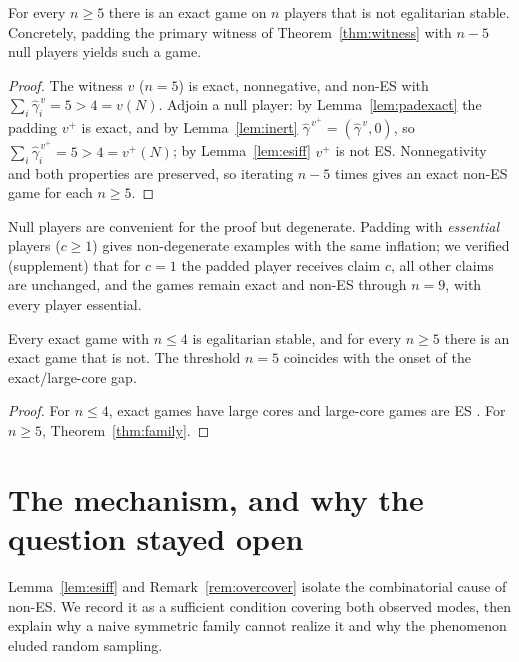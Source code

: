 \begin{theorem}\label{thm:family}
For every $n\ge5$ there is an exact game on $n$ players that is not egalitarian
stable. Concretely, padding the primary witness of Theorem~\ref{thm:witness}
with $n-5$ null players yields such a game.
\end{theorem}

\begin{proof}
The witness $v$ ($n=5$) is exact, nonnegative, and non-ES with
$\sum_i\widehat\gamma^{\,v}_i=5>4=v(N)$. Adjoin a null player: by
Lemma~\ref{lem:padexact} the padding $v^{+}$ is exact, and by
Lemma~\ref{lem:inert} $\widehat\gamma^{\,v^{+}}=(\widehat\gamma^{\,v},0)$, so
$\sum_i\widehat\gamma^{\,v^{+}}_i=5>4=v^{+}(N)$; by Lemma~\ref{lem:esiff}
$v^{+}$ is not ES. Nonnegativity and both properties are preserved, so iterating
$n-5$ times gives an exact non-ES game for each $n\ge5$.
\end{proof}

Null players are convenient for the proof but degenerate. Padding with
\emph{essential} players ($c\ge1$) gives non-degenerate examples with the same
inflation; we verified (supplement) that for $c=1$ the padded player receives
claim $c$, all other claims are unchanged, and the games remain exact and non-ES
through $n=9$, with every player essential.

\begin{corollary}\label{cor:threshold}
Every exact game with $n\le4$ is egalitarian stable, and for every $n\ge5$ there
is an exact game that is not. The threshold $n=5$ coincides with the onset of the
exact/large-core gap.
\end{corollary}

\begin{proof}
For $n\le4$, exact games have large cores \citep{Biswas1999} and large-core games
are ES \citep{Dietzenbacher2021}. For $n\ge5$, Theorem~\ref{thm:family}.
\end{proof}


\section{The mechanism, and why the question stayed open}\label{sec:mechanism}

Lemma~\ref{lem:esiff} and Remark~\ref{rem:overcover} isolate the combinatorial
cause of non-ES. We record it as a sufficient condition covering both observed
modes, then explain why a naive symmetric family cannot realize it and why the
phenomenon eluded random sampling.

